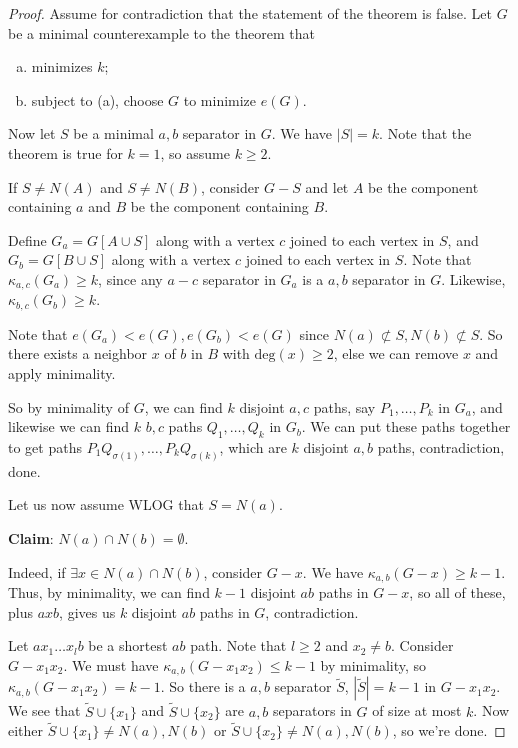 \documentclass{article}
\theoremstyle{definition}
\begin{document}
\begin{proof}
    Assume for contradiction that the statement of the theorem is false. Let $G$ be a minimal counterexample to the theorem that 
    \begin{enumerate}[(a)]
        \item minimizes $k$;
        \item subject to (a), choose $G$ to minimize $e(G)$.
    \end{enumerate}
    Now let $S$ be a minimal $a,b$ separator in $G$. We have $|S|=k$. Note that the theorem is true for $k=1$, so assume $k\ge 2$.

    If $S \neq N(A)$ and $S\neq N(B)$, consider $G-S$ and let $A$ be the component containing $a$ and $B$ be the component containing $B$.
    \vspace{1mm}
    
    Define $G_a = G[A \cup S]$ along with a vertex $c$ joined to each vertex in $S$, and $G_b = G[B \cup S]$ along with a vertex $c$ joined to each vertex in $S$. Note that $\kappa_{a,c}(G_a) \ge k$, since any $a-c$ separator in $G_a$ is a $a,b$ separator in $G$. Likewise, $\kappa_{b,c}(G_b)\ge k$.

    \vspace{1mm}
    
    Note that $e(G_a) < e(G), e(G_b) < e(G)$ since $ N(a) \not\subset S, N(b) \not\subset S$. So there exists a neighbor $x$ of $b$ in $B$ with $\text{deg}(x) \ge 2$, else we can remove $x$ and apply minimality. 
    
    So by minimality of $G$, we can find $k$ disjoint $a,c$ paths, say $P_1,\ldots,P_k$ in $G_a$, and likewise we can find $k$ $b,c$ paths $Q_1,\ldots,Q_k$ in $G_b$. We can put these paths together to get paths $P_1Q_{\sigma(1)},\ldots,P_kQ_{\sigma(k)}$, which are $k$ disjoint $a,b$ paths, contradiction, done.
    \vspace{1mm}
    
    Let us now assume WLOG that $S=N(a)$. 
    \vspace{1mm}
    
    \textbf{Claim}: $N(a) \cap N(b) = \emptyset$.
    
    Indeed, if $\exists x \in N(a) \cap N(b)$, consider $G-x$. We have $\kappa_{a,b}(G-x)\ge k-1$. Thus, by minimality, we can find $k-1$ disjoint $ab$ paths in $G-x$, so all of these, plus $axb$, gives us $k$ disjoint $ab$ paths in $G$, contradiction.
    \vspace{1mm}
    
    Let $ax_1\ldots x_l b$ be a shortest $ab$ path. Note that $l\ge 2$ and $x_2 \neq b$. Consider $G-x_1x_2$. We must have $\kappa_{a,b}(G-x_1x_2)\le k-1$ by minimality, so $\kappa_{a,b}(G-x_1x_2)=k-1$. So there is a $a,b$ separator $\tilde{S}$, $|\tilde{S}| = k-1$ in $G-x_1x_2$. We see that $\tilde{S} \cup \{x_1\}$ and $\tilde{S} \cup \{x_2\}$ are $a,b$ separators in $G$ of size at most $k$. Now either $\tilde{S} \cup \{x_1\} \neq N(a),N(b)$ or $\tilde{S} \cup \{x_2\} \neq N(a),N(b)$, so we're done.
\end{proof}
\end{document}
